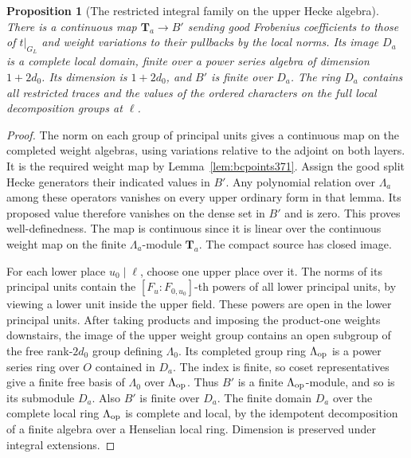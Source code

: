 \documentclass[a4paper,11pt]{article}
\newtheorem{proposition}{Proposition}[section]
\theoremstyle{definition}
\theoremstyle{remark}
\numberwithin{equation}{section}
\begin{document}
\begin{proposition}[The restricted integral family on the upper Hecke algebra]
\label{prop:bchecke371}
There is a continuous map \(\mathbf T_a\to B'\) sending
good Frobenius coefficients to those of \(t|_{G_L}\) and
weight variations to their pullbacks by the local norms.
Its image \(D_a\) is a complete local domain, finite over
a power series algebra of dimension \(1+2d_0\). Its
dimension is \(1+2d_0\), and \(B'\) is finite over \(D_a\).
The ring \(D_a\) contains all restricted traces and the
values of the ordered characters on the full local
decomposition groups at \(\ell\).
\end{proposition}
\begin{proof}
The norm on each group of principal units gives a continuous
map on the completed weight algebras, using variations
relative to the adjoint on both layers. It is the required
weight map by Lemma~\ref{lem:bcpoints371}. Assign the good
split Hecke generators their indicated values in \(B'\).
Any polynomial relation over \(\Lambda_a\) among these
operators vanishes on every upper ordinary form in that
lemma. Its proposed value therefore vanishes on the dense
set in \(B'\) and is zero. This proves well-definedness.
The map is continuous since it is linear over the continuous
weight map on the finite \(\Lambda_a\)-module \(\mathbf T_a\).
The compact source has closed image.

For each lower place \(u_0\mid\ell\), choose one upper place
over it. The norms of its principal units contain the
\([F_u:F_{0,u_0}]\)-th powers of all lower principal units,
by viewing a lower unit inside the upper field. These powers
are open in the lower principal units. After taking products
and imposing the product-one weights downstairs, the image
of the upper weight group contains an open subgroup of the
free rank-\(2d_0\) group defining \(\Lambda_0\). Its completed
group ring \(\Lambda_{\rm op}\) is a power series ring over \(O\)
contained in \(D_a\). The index is finite, so coset
representatives give a finite free basis of \(\Lambda_0\)
over \(\Lambda_{\rm op}\). Thus \(B'\) is a finite
\(\Lambda_{\rm op}\)-module, and so is its submodule \(D_a\).
Also \(B'\) is finite over \(D_a\). The finite domain
\(D_a\) over the complete local ring \(\Lambda_{\rm op}\)
is complete and local, by the idempotent decomposition of
a finite algebra over a Henselian local ring. Dimension
is preserved under integral extensions.


\end{proof}
\end{document}
